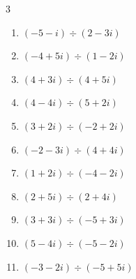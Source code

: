 \begin{multicols}{3}
\begin{enumerate}
\columnbreak %

  \item $\displaystyle (-5-i)\div(2-3i)$


  \item $\displaystyle (-4+5i)\div(1-2i)$


  \item $\displaystyle (4+3i)\div(4+5i)$


  \item $\displaystyle (4-4i)\div(5+2i)$


  \item $\displaystyle (3+2i)\div(-2+2i)$


  \item $\displaystyle (-2-3i)\div(4+4i)$


  \item $\displaystyle (1+2i)\div(-4-2i)$


  \item $\displaystyle (2+5i)\div(2+4i)$


  \item $\displaystyle (3+3i)\div(-5+3i)$


  \item $\displaystyle (5-4i)\div(-5-2i)$


\columnbreak %

\resetques

  \item $\displaystyle (-3-2i)\div(-5+5i)$



\end{enumerate}
\end{multicols}
